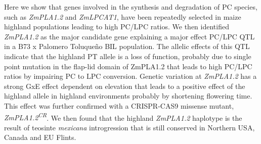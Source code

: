 \documentclass[9pt,twocolumn,twoside,lineno]{BioRxiv}
\begin{document}
Here we show that genes involved in the synthesis and degradation of PC species, such as \textit{ZmPLA1.2} and \textit{ZmLPCAT1}, have been repeatedly selected in maize highland populations leading to high PC/LPC ratios.   
We then identified \textit{ZmPLA1.2} as the major candidate gene explaining a major effect PC/LPC QTL in a B73 x Palomero Toluqueño BIL population. 
The allelic effects of this QTL indicate that the highland PT allele is a loss of function, probably due to single point mutation in the flap-lid domain of ZmPLA1.2 that leads to high PC/LPC ratios by impairing PC to LPC conversion. 
Genetic variation at \textit{ZmPLA1.2} has a strong GxE effect dependent on elevation that leads to a positive effect of the highland allele in highland environments probably by shortening flowering time.
This effect was further confirmed with a CRISPR-CAS9 missense mutant, \textit{ZmPLA1.2\textsuperscript{CR}}.
We then found that the highland \textit{ZmPLA1.2} haplotype is the result of teosinte \textit{mexicana} introgression that is still conserved in Northern USA, Canada and EU Flints. 
\end{document}

